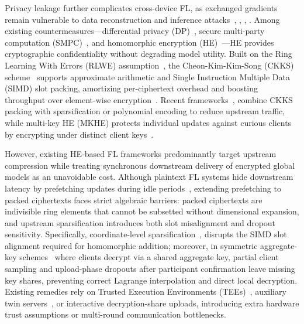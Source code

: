 Privacy leakage further complicates cross-device FL, as exchanged gradients remain vulnerable to data reconstruction and inference attacks~\cite{zhu2019deep}, \cite{geiping2020inverting}, \cite{zhao2020idlg}, \cite{guo2025exploring}. Among existing countermeasures---differential privacy (DP)~\cite{mcmahan2017learning}, secure multi-party computation (SMPC)~\cite{bonawitz2017practical}, and homomorphic encryption (HE)~\cite{gentry2009fully}---HE provides cryptographic confidentiality without degrading model utility. Built on the Ring Learning With Errors (RLWE) assumption~\cite{lyubashevsky2010ideal}, the Cheon-Kim-Kim-Song (CKKS) scheme~\cite{cheon2017homomorphic} supports approximate arithmetic and Single Instruction Multiple Data (SIMD) slot packing, amortizing per-ciphertext overhead and boosting throughput over element-wise encryption~\cite{pan2024fedshe}. Recent frameworks~\cite{li2025fedphe}, \cite{wu2025esafl} combine CKKS packing with sparsification or polynomial encoding to reduce upstream traffic, while multi-key HE (MKHE) protects individual updates against curious clients by encrypting under distinct client keys~\cite{cai2023secfed}.


However, existing HE-based FL frameworks predominantly target upstream compression while treating synchronous downstream delivery of encrypted global models as an unavoidable cost. Although plaintext FL systems hide downstream latency by prefetching updates during idle periods~\cite{yan2025fedfetch}, extending prefetching to packed ciphertexts faces strict algebraic barriers: packed ciphertexts are indivisible ring elements that cannot be subsetted without dimensional expansion, and upstream sparsification introduces both slot misalignment and dropout sensitivity. Specifically, coordinate-level sparsification~\cite{sattler2019sparse}, \cite{sattler2019robust} disrupts the SIMD slot alignment required for homomorphic addition; moreover, in symmetric aggregate-key schemes~\cite{wu2025esafl} where clients decrypt via a shared aggregate key, partial client sampling and upload-phase dropouts after participant confirmation leave missing key shares, preventing correct Lagrange interpolation and direct local decryption. Existing remedies rely on Trusted Execution Environments (TEEs)~\cite{cai2023secfed}, auxiliary twin servers~\cite{yuan2026fedout}, or interactive decryption-share uploads, introducing extra hardware trust assumptions or multi-round communication bottlenecks.


